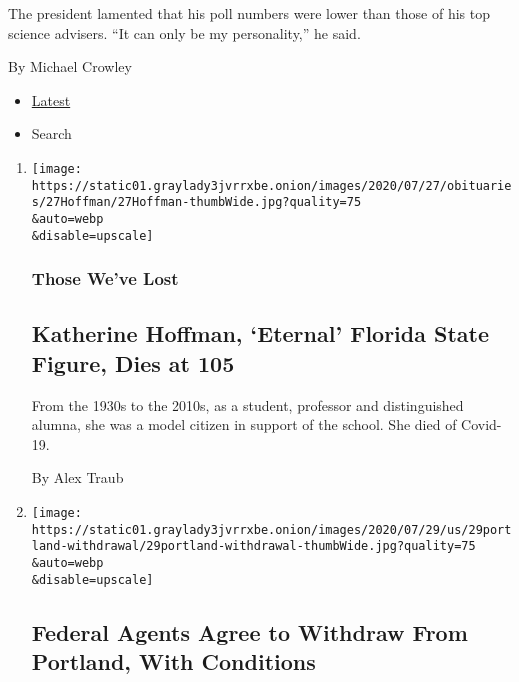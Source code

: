 \begin{enumerate}
  The president lamented that his poll numbers were lower than those of
  his top science advisers. ``It can only be my personality,'' he said.

  By Michael Crowley
\end{enumerate}

\begin{itemize}
\tightlist
\item
  \protect\hyperlink{stream-panel}{Latest}
\item
  Search
\end{itemize}

\begin{enumerate}
\def\labelenumi{\arabic{enumi}.}
\item
  \href{/2020/07/29/obituaries/katherine-hoffman-dead-coronavirus.html}{}

  \texttt{[image: https://static01.graylady3jvrrxbe.onion/images/2020/07/27/obituaries/27Hoffman/27Hoffman-thumbWide.jpg?quality=75\\\&auto=webp\\\&disable=upscale]}

  \hypertarget{those-weve-lost}{%
  \subsubsection{Those We've Lost}\label{those-weve-lost}}

  \hypertarget{katherine-hoffman-eternal-florida-state-figure-dies-at-105}{%
  \subsection{Katherine Hoffman, `Eternal' Florida State Figure, Dies at
  105}\label{katherine-hoffman-eternal-florida-state-figure-dies-at-105}}

  From the 1930s to the 2010s, as a student, professor and distinguished
  alumna, she was a model citizen in support of the school. She died of
  Covid-19.

  By Alex Traub
\item
  \href{/2020/07/29/us/protests-portland-federal-withdrawal.html}{}

  \texttt{[image: https://static01.graylady3jvrrxbe.onion/images/2020/07/29/us/29portland-withdrawal/29portland-withdrawal-thumbWide.jpg?quality=75\\\&auto=webp\\\&disable=upscale]}

  \hypertarget{federal-agents-agree-to-withdraw-from-portland-with-conditions-1}{%
  \subsection{Federal Agents Agree to Withdraw From Portland, With
  Conditions}\label{federal-agents-agree-to-withdraw-from-portland-with-conditions-1}}


\end{enumerate}
